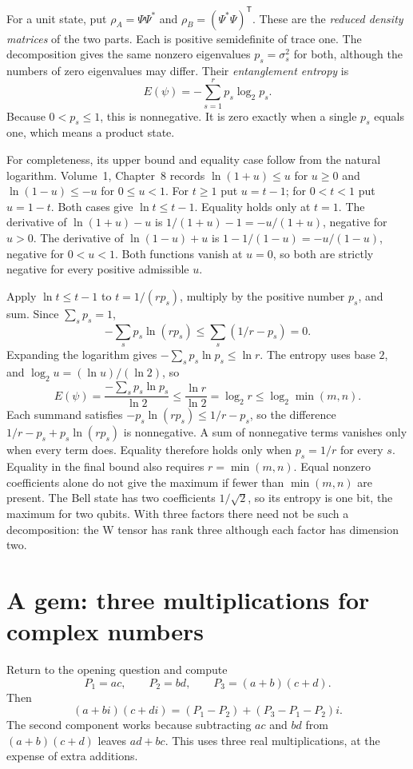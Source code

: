 For a unit state, put $\rho_A=\Psi\Psi^*$ and $\rho_B=(\Psi^*\Psi)^{\mathsf T}$. These are the \emph{reduced density matrices} of the two parts. Each is positive semidefinite of trace one. The decomposition gives the same nonzero eigenvalues $p_s=\sigma_s^2$ for both, although the numbers of zero eigenvalues may differ. Their \emph{entanglement entropy} is
\[
E(\psi)=-\sum_{s=1}^r p_s\log_2p_s.
\]
Because $0<p_s\le1$, this is nonnegative. It is zero exactly when a single $p_s$ equals one, which means a product state.

For completeness, its upper bound and equality case follow from the natural logarithm. Volume~1, Chapter~8 records $\ln(1+u)\le u$ for $u\ge0$ and $\ln(1-u)\le -u$ for $0\le u<1$. For $t\ge1$ put $u=t-1$; for $0<t<1$ put $u=1-t$. Both cases give $\ln t\le t-1$. Equality holds only at $t=1$. The derivative of $\ln(1+u)-u$ is $1/(1+u)-1=-u/(1+u)$, negative for $u>0$. The derivative of $\ln(1-u)+u$ is $1-1/(1-u)=-u/(1-u)$, negative for $0<u<1$. Both functions vanish at $u=0$, so both are strictly negative for every positive admissible $u$.

Apply $\ln t\le t-1$ to $t=1/(rp_s)$, multiply by the positive number $p_s$, and sum. Since $\sum_sp_s=1$,
\[
-\sum_sp_s\ln(rp_s)\le\sum_s(1/r-p_s)=0.
\]
Expanding the logarithm gives $-\sum_sp_s\ln p_s\le\ln r$. The entropy uses base $2$, and $\log_2 u=(\ln u)/(\ln 2)$, so
\[
E(\psi)=\frac{-\sum_sp_s\ln p_s}{\ln 2}\le\frac{\ln r}{\ln 2}=\log_2 r\le\log_2\min(m,n).
\]
Each summand satisfies $-p_s\ln(rp_s)\le 1/r-p_s$, so the difference $1/r-p_s+p_s\ln(rp_s)$ is nonnegative. A sum of nonnegative terms vanishes only when every term does. Equality therefore holds only when $p_s=1/r$ for every $s$. Equality in the final bound also requires $r=\min(m,n)$. Equal nonzero coefficients alone do not give the maximum if fewer than $\min(m,n)$ are present. The Bell state has two coefficients $1/\sqrt2$, so its entropy is one bit, the maximum for two qubits. With three factors there need not be such a decomposition: the W tensor has rank three although each factor has dimension two.

\section{A gem: three multiplications for complex numbers}

Return to the opening question and compute
\[
P_1=ac,\qquad P_2=bd,\qquad P_3=(a+b)(c+d).
\]
Then
\[
(a+bi)(c+di)=(P_1-P_2)+(P_3-P_1-P_2)i.
\]
The second component works because subtracting $ac$ and $bd$ from $(a+b)(c+d)$ leaves $ad+bc$. This uses three real multiplications, at the expense of extra additions.

